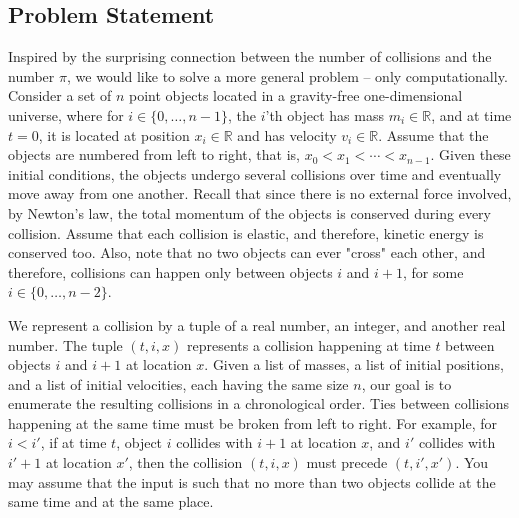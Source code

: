 \documentclass{article}
\begin{document}
\subsection*{Problem Statement}
Inspired by the surprising connection between the number of collisions and the number $\pi$, we would like to solve a more general problem – only computationally. Consider a set of $n$ point objects located in a gravity-free one-dimensional universe, where for $i \in \{0, \dots, n-1\}$, the $i$'th object has mass $m_i \in \mathbb{R}$, and at time $t = 0$, it is located at position $x_i \in \mathbb{R}$ and has velocity $v_i \in \mathbb{R}$. Assume that the objects are numbered from left to right, that is, $x_0 < x_1 < \cdots < x_{n-1}$. Given these initial conditions, the objects undergo several collisions over time and eventually move away from one another. Recall that since there is no external force involved, by Newton’s law, the total momentum of the objects is conserved during every collision. Assume that each collision is elastic, and therefore, kinetic energy is conserved too. Also, note that no two objects can ever "cross" each other, and therefore, collisions can happen only between objects $i$ and $i+1$, for some $i \in \{0, \dots, n-2\}$.

We represent a collision by a tuple of a real number, an integer, and another real number. The tuple $(t, i, x)$ represents a collision happening at time $t$ between objects $i$ and $i+1$ at location $x$. Given a list of masses, a list of initial positions, and a list of initial velocities, each having the same size $n$, our goal is to enumerate the resulting collisions in a chronological order. Ties between collisions happening at the same time must be broken from left to right. For example, for $i < i'$, if at time $t$, object $i$ collides with $i+1$ at location $x$, and $i'$ collides with $i'+1$ at location $x'$, then the collision $(t, i, x)$ must precede $(t, i', x')$. You may assume that the input is such that no more than two objects collide at the same time and at the same place.
\end{document}
